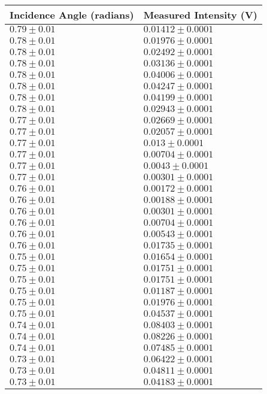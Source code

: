 \begin{tabular}{| p{} | p{} |}
\hline
Incidence Angle (radians) & Measured Intensity (V)\\
\hline
$0.79 \pm 0.01$ & $0.01412 \pm 0.0001$\\
$0.78 \pm 0.01$ & $0.01976 \pm 0.0001$\\
$0.78 \pm 0.01$ & $0.02492 \pm 0.0001$\\
$0.78 \pm 0.01$ & $0.03136 \pm 0.0001$\\
$0.78 \pm 0.01$ & $0.04006 \pm 0.0001$\\
$0.78 \pm 0.01$ & $0.04247 \pm 0.0001$\\
$0.78 \pm 0.01$ & $0.04199 \pm 0.0001$\\
$0.78 \pm 0.01$ & $0.02943 \pm 0.0001$\\
$0.77 \pm 0.01$ & $0.02669 \pm 0.0001$\\
$0.77 \pm 0.01$ & $0.02057 \pm 0.0001$\\
$0.77 \pm 0.01$ & $0.013 \pm 0.0001$\\
$0.77 \pm 0.01$ & $0.00704 \pm 0.0001$\\
$0.77 \pm 0.01$ & $0.0043 \pm 0.0001$\\
$0.77 \pm 0.01$ & $0.00301 \pm 0.0001$\\
$0.76 \pm 0.01$ & $0.00172 \pm 0.0001$\\
$0.76 \pm 0.01$ & $0.00188 \pm 0.0001$\\
$0.76 \pm 0.01$ & $0.00301 \pm 0.0001$\\
$0.76 \pm 0.01$ & $0.00704 \pm 0.0001$\\
$0.76 \pm 0.01$ & $0.00543 \pm 0.0001$\\
$0.76 \pm 0.01$ & $0.01735 \pm 0.0001$\\
$0.75 \pm 0.01$ & $0.01654 \pm 0.0001$\\
$0.75 \pm 0.01$ & $0.01751 \pm 0.0001$\\
$0.75 \pm 0.01$ & $0.01751 \pm 0.0001$\\
$0.75 \pm 0.01$ & $0.01187 \pm 0.0001$\\
$0.75 \pm 0.01$ & $0.01976 \pm 0.0001$\\
$0.75 \pm 0.01$ & $0.04537 \pm 0.0001$\\
$0.74 \pm 0.01$ & $0.08403 \pm 0.0001$\\
$0.74 \pm 0.01$ & $0.08226 \pm 0.0001$\\
$0.74 \pm 0.01$ & $0.07485 \pm 0.0001$\\
$0.73 \pm 0.01$ & $0.06422 \pm 0.0001$\\
$0.73 \pm 0.01$ & $0.04811 \pm 0.0001$\\
$0.73 \pm 0.01$ & $0.04183 \pm 0.0001$\\
\hline
\end{tabular}\hfill
